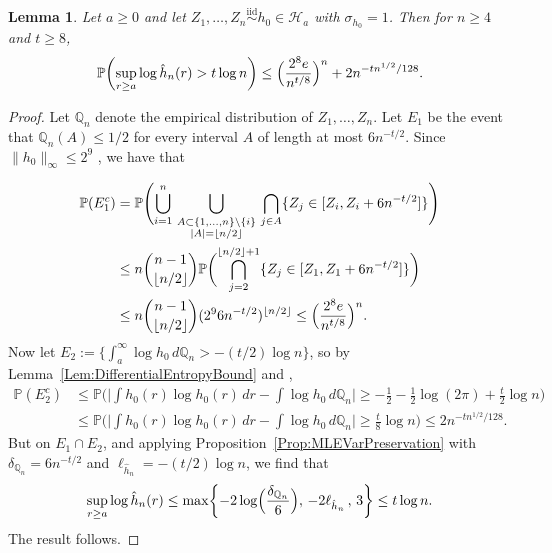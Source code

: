 \documentclass[a4paper,12pt]{article}
\newtheorem{lemma}[theorem]{Lemma}
\begin{document}
\begin{lemma}
  \label{Lem:ExtremeEventControl}
Let $a \geq 0$ and let $Z_1,\ldots, Z_n \stackrel{\mathrm{iid}}{\sim} h_0 \in \mathcal{H}_{a}$ with $\sigma_{h_0} = 1$.  Then for $n \geq 4$ and $t \geq 8$,
\[
\mathbb{P}\biggl(\sup_{r \geq a} \log \hat{h}_n(r) > t\log n\biggr) \leq \Bigl(\frac{2^8 e}{n^{t/8}}\Bigr)^n + 2n^{-t n^{1/2}/128}.
\]
\end{lemma}
\begin{proof}
  Let $\mathbb{Q}_n$ denote the empirical distribution of $Z_1,\ldots,Z_n$.  Let $E_{1}$ be the event that $\mathbb{Q}_n(A) \leq 1/2$ for every interval $A$ of length at most $6n^{-t/2}$.  Since $\|h_0\|_\infty \leq 2^9$ \citep[][Theorem~5.14(b) and (d)]{lovasz2007geometry}, we have that

\begin{align*}
  \mathbb{P}(E_1^c) &= \mathbb{P}\Biggl(\bigcup_{i=1}^n \, \bigcup_{\substack{ A \subset \{1,\ldots,n\} \setminus \{i\} \\ |A| = \lfloor n /2 \rfloor} } \, \bigcap_{j \in A} \{Z_j \in [Z_i,Z_i+6n^{-t/2}]\} \Biggr)  \\
                    &\leq n \binom{n-1}{ \lfloor n/2 \rfloor } \mathbb{P} \biggl( \bigcap_{j=2}^{ \lfloor n/2\rfloor + 1} \{ Z_j \in [Z_1, Z_1 + 6 n^{-t/2}] \} \biggr) \\
    &\leq n \binom{n-1}{ \lfloor n/2 \rfloor } (2^9 6 n^{-t/2})^{\lfloor n/2 \rfloor} \leq  \Bigl(\frac{2^8 e}{n^{t/8}}\Bigr)^n.
\end{align*}
Now let $E_{2} := \bigl\{\int_{a}^\infty  \log h_0 \, d\mathbb{Q}_n > -(t/2) \log n\bigr\}$, so by Lemma~\ref{Lem:DifferentialEntropyBound} and \citet[][Theorem~1.1]{bobkov2011concentration},
  \begin{align*}
\mathbb{P}(E_2^c) &\leq \mathbb{P}\biggl(\biggl|\int h_0(r) \log h_0(r) \, dr - \int \log h_0 \, d\mathbb{Q}_n\biggr| \geq -\frac{1}{2} - \frac{1}{2}\log(2\pi) + \frac{t}{2} \log n\biggr) \\
 &\leq \mathbb{P}\biggl(\biggl|\int h_0(r) \log h_0(r) \, dr - \int \log h_0 \, d\mathbb{Q}_n\biggr| \geq \frac{t}{8} \log n\biggr) \leq 2n^{-t n^{1/2}/128}.
\end{align*}
But on $E_1 \cap E_2$, and applying Proposition~\ref{Prop:MLEVarPreservation} with $\delta_{\mathbb{Q}_n} = 6n^{-t/2}$ and $\ell_{\hat{h}_n} = -(t/2)\log n$, we find that 
\[
\sup_{r \geq a} \log \hat{h}_n(r) \leq \max \biggl\{ - 2 \log \Bigl( \frac{\delta_{\mathbb{Q}_n}}{6} \Bigr),\, - 2 \ell_{\hat{h}_n} \, , \, 3\biggr\} \leq t \log n.
\]
The result follows.

\end{proof}
\end{document}
